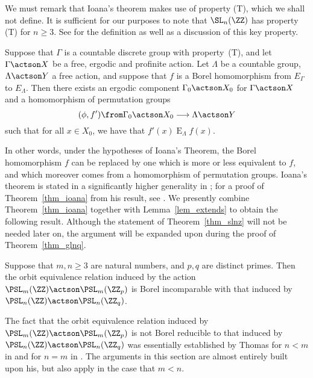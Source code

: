 \documentclass[oneside,leqno,11pt]{amsart}
\begin{document}
We must remark that Ioana's theorem makes use of property (T), which
we shall not define.  It is sufficient for our purposes to note that
$\SL_n(\ZZ)$ has property (T) for $n\geq3$.  See \cite{lubotzky} for
the definition as well as a discussion of this key property.

\begin{thm}
  \label{thm_ioana}
  Suppose that $\Gamma$ is a countable discrete group with
  property~(T), and let $\Gamma\actson X$ be a free, ergodic and
  profinite action.  Let $\Lambda$ be a countable group,
  $\Lambda\actson Y$ a free action, and suppose that $f$ is a Borel
  homomorphism from $E_\Gamma$ to $E_\Lambda$.  Then there exists an
  ergodic component $\Gamma_0\actson X_0$ for $\Gamma\actson X$ and a
  homomorphism of permutation groups
  \[(\phi,f')\from\Gamma_0\actson X_0\longrightarrow\Lambda\actson Y
  \]
  such that for all $x\in X_0$, we have that
  $f'(x)\mathrel{E}_\Lambda f(x)$.
\end{thm}

In other words, under the hypotheses of Ioana's Theorem, the Borel
homomorphism $f$ can be replaced by one which is more or less
equivalent to $f$, and which moreover comes from a homomorphism of
permutation groups.  Ioana's theorem is stated in a significantly
higher generality in \cite{ioana}; for a proof of
Theorem~\ref{thm_ioana} from his result, see
\cite[Corollary~3.3]{quasi}.  We presently combine
Theorem~\ref{thm_ioana} together with Lemma~\ref{lem_extends} to
obtain the following result.  Although the statement of
Theorem~\ref{thm_slnz} will not be needed later on, the argument will
be expanded upon during the proof of Theorem~\ref{thm_glnq}.

\begin{thm}
  \label{thm_slnz}
  Suppose that $m,n\geq3$ are natural numbers, and $p,q$ are distinct
  primes.  Then the orbit equivalence relation induced by the action
  $\PSL_m(\ZZ)\actson\PSL_m(\ZZ_p)$ is Borel incomparable with that
  induced by $\PSL_n(\ZZ)\actson\PSL_n(\ZZ_q)$.
\end{thm}

The fact that the orbit equivalence relation induced by
$\PSL_m(\ZZ)\actson\PSL_m(\ZZ_p)$ is not Borel reducible to that
induced by $\PSL_n(\ZZ)\actson\PSL_n(\ZZ_q)$ was essentially
established by Thomas for $n<m$ in \cite[Theorem~2.4]{torsionfree} and
for $n=m$ in \cite{super}.  The arguments in this section are almost
entirely built upon his, but also apply in the case that $m<n$.
\end{document}
